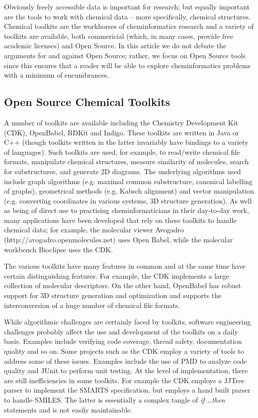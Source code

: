 \documentclass{sig-alternate}
\begin{document}
Obviously freely accessible data is important for research; but
equally important are the tools to work with chemical data -- more
specifically, chemical structures. Chemical toolkits are the workhorses
of cheminformatics research and a variety of toolkits are available,
both commericial (which, in many cases, provide free academic
licenses) and Open Source. In this article we do not debate the
arguments for and against Open Source; rather, we focus on Open Source
tools since this ensures that a reader will be able to explore
cheminformatics problems with a minimum of encumbrances.

\subsection{Open Source Chemical Toolkits}

A number of toolkits are available including the Chemistry Development
Kit (CDK), OpenBabel, RDKit and Indigo. These toolkits are written in
Java or C++ (though toolkits written in the latter invariably have
bindings to a variety of languages). Such toolkits are used, for
example, to read/write chemical file formats, manipulate chemical
structures, measure similarity of molecules, search for substructures,
and generate 2D diagrams. The underlying algorithms used include graph
algorithms (e.g. maximal common substructure, canonical labelling of
graphs), geometrical methods (e.g. Kabsch alignment) and vector
manipulation (e.g. converting coordinates in various systems, 3D
structure generation). As well as being of direct use to practising
cheminformaticians in their day-to-day work, many applications have
been developed that rely on these toolkits to handle chemical data;
for example, the molecular viewer Avogadro
(http://avogadro.openmolecules.net) uses Open Babel, while the
molecular workbench Bioclipse \cite{Bioclipse2} uses the CDK.
 
The various toolkits have many features in common and at the same time
have certain distinguishing features. For example, the CDK implements
a large collection of molecular descriptors. On the other hand,
OpenBabel has robust support for 3D structure generation and
optimization and supports the interconversion of a huge number of
chemical file formats. 

While algorithmic challenges are certainly faced by toolkits, software
engineering challenges probably affect the use and development of the
toolkits on a daily basis. Examples include verifying code coverage,
thread safety, documentation quality and so on. Some projects such as
the CDK employ a variety of tools to address some of these issues.
Examples include the use of PMD to analyze code quality and JUnit to
perform unit testing. At the level of implementation, there are still
inefficiencies in some toolkits. For example the CDK employs a JJTree
parser to implement the SMARTS specification, but employs a hand built
parser to handle SMILES. The latter is essentially a complex tangle of
\emph{if \ldots then} statements and is not easily maintainable. 
\end{document}
